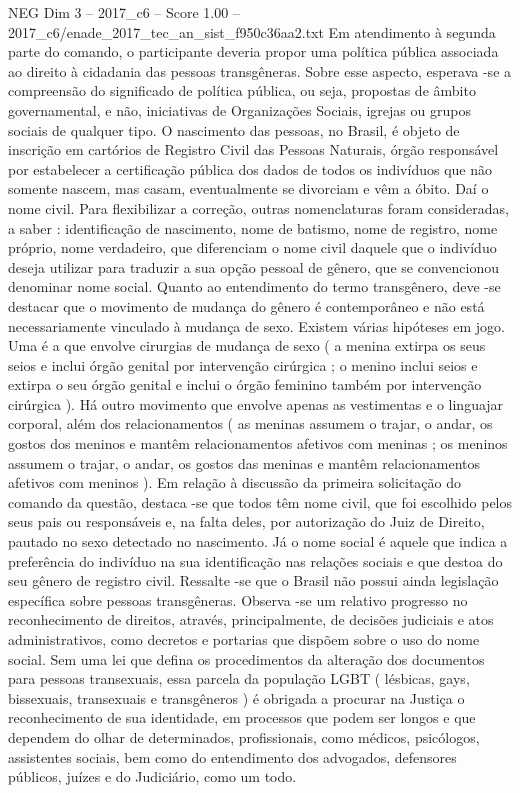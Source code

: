 \begin{textsample}{NEG Dim 3 – 2017\_c6 – Score 1.00 – 2017\_c6/enade\_2017\_tec\_an\_sist\_f950c36aa2.txt}
Em atendimento à segunda parte do comando, o participante deveria propor uma política pública associada ao direito à cidadania das pessoas transgêneras.
Sobre esse aspecto, esperava -se a compreensão do significado de política pública, ou seja, propostas de âmbito governamental, e não, iniciativas de Organizações Sociais, igrejas ou grupos sociais de qualquer tipo.
O nascimento das pessoas, no Brasil, é objeto de inscrição em cartórios de Registro Civil das Pessoas Naturais, órgão responsável por estabelecer a certificação pública dos dados de todos os indivíduos que não somente nascem, mas casam, eventualmente se divorciam e vêm a óbito.
Daí o nome civil.
Para flexibilizar a correção, outras nomenclaturas foram consideradas, a saber : identificação de nascimento, nome de batismo, nome de registro, nome próprio, nome verdadeiro, que diferenciam o nome civil daquele que o indivíduo deseja utilizar para traduzir a sua opção pessoal de gênero, que se convencionou denominar nome social.
Quanto ao entendimento do termo transgênero, deve -se destacar que o movimento de mudança do gênero é contemporâneo e não está necessariamente vinculado à mudança de sexo.
Existem várias hipóteses em jogo.
Uma é a que envolve cirurgias de mudança de sexo ( a menina extirpa os seus seios e inclui órgão genital por intervenção cirúrgica ; o menino inclui seios e extirpa o seu órgão genital e inclui o órgão feminino também por intervenção cirúrgica ).
Há outro movimento que envolve apenas as vestimentas e o linguajar corporal, além dos relacionamentos ( as meninas assumem o trajar, o andar, os gostos dos meninos e mantêm relacionamentos afetivos com meninas ; os meninos assumem o trajar, o andar, os gostos das meninas e mantêm relacionamentos afetivos com meninos ).
Em relação à discussão da primeira solicitação do comando da questão, destaca -se que todos têm nome civil, que foi escolhido pelos seus pais ou responsáveis e, na falta deles, por autorização do Juiz de Direito, pautado no sexo detectado no nascimento.
Já o nome social é aquele que indica a preferência do indivíduo na sua identificação nas relações sociais e que destoa do seu gênero de registro civil.
Ressalte -se que o Brasil não possui ainda legislação específica sobre pessoas transgêneras.
Observa -se um relativo progresso no reconhecimento de direitos, através, principalmente, de decisões judiciais e atos administrativos, como decretos e portarias que dispõem sobre o uso do nome social.
Sem uma lei que defina os procedimentos da alteração dos documentos para pessoas transexuais, essa parcela da população LGBT ( lésbicas, gays, bissexuais, transexuais e transgêneros ) é obrigada a procurar na Justiça o reconhecimento de sua identidade, em processos que podem ser longos e que dependem do olhar de determinados, profissionais, como médicos, psicólogos, assistentes sociais, bem como do entendimento dos advogados, defensores públicos, juízes e do Judiciário, como um todo.

\end{textsample}
